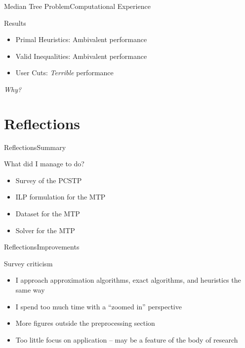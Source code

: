 \documentclass[rgb,dvipsnames]{beamer}
\begin{document}
\begin{frame}{Median Tree Problem}{Computational Experience}
  \begin{block}{Results}
    \pause
    \begin{itemize}[<+->]
    \item Primal Heuristics: Ambivalent performance
    \item Valid Inequalities: Ambivalent performance
    \item User Cuts: \textit{Terrible} performance
    \end{itemize}
  \end{block}
  \pause
  \textit{Why?}
\end{frame}

\section{Reflections}
\begin{frame}{Reflections}{Summary}
  \begin{block}{What did I manage to do?}
    \begin{itemize}
    \item Survey of the PCSTP
    \item ILP formulation for the MTP
    \item Dataset for the MTP
    \item Solver for the MTP
    \end{itemize}
  \end{block}
\end{frame}

\begin{frame}{Reflections}{Improvements}
  \begin{block}{Survey criticism}
    \begin{itemize}[<+->]
    \item I approach approximation algorithms, exact algorithms, and heuristics the same way
    \item I spend too much time with a ``zoomed in'' perspective
    \item More figures outside the preprocessing section
    \item Too little focus on application -- may be a feature of the body of research
    \end{itemize}
  \end{block}
\end{frame}
\end{document}
